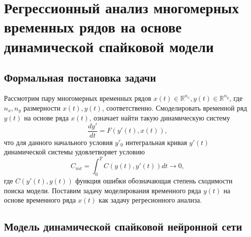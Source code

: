 
\chapter{Регрессионный анализ многомерных временных рядов на основе динамической спайковой модели} \label{chapt2}

\section{Формальная постановка задачи} \label{sect2_1}
\indent Рассмотрим пару многомерных временных рядов $x(t) \in \mathbb{R}^{n_{x}}, y(t) \in \mathbb{R}^{n_{y}}$, где $n_{x}, n_{y}$ размерности $x(t), y(t)$, соответственно. Смоделировать временной ряд $y(t)$ на основе ряда $x(t)$, означает найти  такую динамическую систему 
\begin{equation}
\frac{dy'}{dt} = F(y'(t), x(t)),
\end{equation}
что для данного начального условия $y'_{0}$ интегральная кривая $y'(t)$ динамической системы удовлетворяет условию
\begin{equation}
C_{int} = \int_{0}^{T} C(y(t), y'(t)) dt \rightarrow 0,
\end{equation}
где $C(y'(t), y(t))$ функция ошибки обозначающая степень сходимости поиска модели. Поставим задачу моделирования временного ряда $y(t)$ на основе временного ряда $x(t)$ как задачу регресионного анализа.


\section{Модель динамической спайковой нейронной сети} \label{sect2_2}
